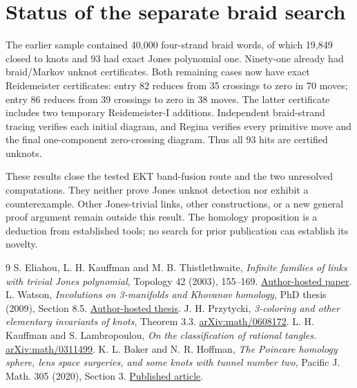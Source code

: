 \documentclass[11pt]{article}
\begin{document}
\section{Status of the separate braid search}
The earlier sample contained 40,000 four-strand braid words, of which 19,849 closed to knots and 93 had exact Jones polynomial one. Ninety-one already had braid/Markov unknot certificates. Both remaining cases now have exact Reidemeister certificates: entry 82 reduces from 35 crossings to zero in 70 moves; entry 86 reduces from 39 crossings to zero in 38 moves. The latter certificate includes two temporary Reidemeister-I additions. Independent braid-strand tracing verifies each initial diagram, and Regina verifies every primitive move and the final one-component zero-crossing diagram. Thus all 93 hits are certified unknots.

These results close the tested EKT band-fusion route and the two unresolved computations. They neither prove Jones unknot detection nor exhibit a counterexample. Other Jones-trivial links, other constructions, or a new general proof argument remain outside this result. The homology proposition is a deduction from established tools; no search for prior publication can establish its novelty.

\small\raggedright
\begin{thebibliography}{9}
 S. Eliahou, L. H. Kauffman and M. B. Thistlethwaite, \emph{Infinite families of links with trivial Jones polynomial}, Topology 42 (2003), 155--169. \href{https://homepages.math.uic.edu/~kauffman/ekt.pdf}{Author-hosted paper}.
 L. Watson, \emph{Involutions on 3-manifolds and Khovanov homology}, PhD thesis (2009), Section 8.5. \href{https://personal.math.ubc.ca/~liam/files/doctoral.pdf}{Author-hosted thesis}.
 J. H. Przytycki, \emph{3-coloring and other elementary invariants of knots}, Theorem 3.3. \href{https://arxiv.org/abs/math/0608172}{arXiv:math/0608172}.
 L. H. Kauffman and S. Lambropoulou, \emph{On the classification of rational tangles}. \href{https://arxiv.org/abs/math/0311499}{arXiv:math/0311499}.
 K. L. Baker and N. R. Hoffman, \emph{The Poincare homology sphere, lens space surgeries, and some knots with tunnel number two}, Pacific J. Math. 305 (2020), Section 3. \href{https://msp.org/pjm/2020/305-1/pjm-v305-n1-p01-s.pdf}{Published article}.
\end{thebibliography}
\end{document}
